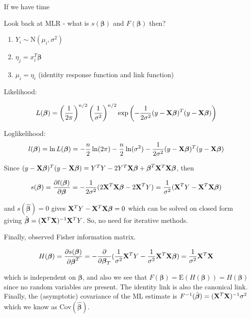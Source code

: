 \documentclass[
  ignorenonframetext,
]{beamer}
\begin{document}
\begin{frame}
If we have time
\end{frame}

\begin{frame}
\begin{block}{Look back at MLR - what is \(s(\boldsymbol{\beta})\) and
\(F(\boldsymbol{\beta})\) then?}
\protect\hypertarget{look-back-at-mlr---what-is-sboldsymbolbeta-and-fboldsymbolbeta-then}{}
\begin{enumerate}
\item
  \(Y_i \sim \text{N}(\mu_i, \sigma^2)\)
\item
  \(\eta_j = x_i^T\boldsymbol{\beta}\)
\item
  \(\mu_i = \eta_i\) (identity response function and link function)
\end{enumerate}

Likelihood:

\[L(\boldsymbol{\beta}) = \left(\frac{1}{2\pi}\right)^{n/2}\left(\frac{1}{\sigma^2}\right)^{n/2} \exp\left(-\frac{1}{2\sigma^2}(y-{\bf X}\boldsymbol{\beta})^T(y-{\bf X}\boldsymbol{\beta})\right)\]

Loglikelihood:
\[l(\boldsymbol{\beta}) = \ln L(\boldsymbol{\beta}) = -\frac{n}{2} \ln (2\pi) - \frac{n}{2} \ln (\sigma^2) - \frac{1}{2\sigma^2}(y-{\bf X}\boldsymbol{\beta})^T(y-{\bf X}\boldsymbol{\beta})\]
\end{block}
\end{frame}

\begin{frame}
Since
\((y-{\bf X}\boldsymbol{\beta})^T(y-{\bf X}\boldsymbol{\beta}) = Y^TY - 2Y^T{\bf X}\boldsymbol{\beta} + \boldsymbol{\beta}^T{\bf X}^T{\bf X}\boldsymbol{\beta}\),
then

\[s(\boldsymbol{\beta}) = \frac{\partial l(\boldsymbol{\beta})}{\partial \boldsymbol{\beta}} = -\frac{1}{2\sigma^2}(2{\bf X}^T{\bf X}\boldsymbol{\beta}-2{\bf X}^TY) = \frac{1}{\sigma^2}({\bf X}^TY - {\bf X}^T{\bf X}\boldsymbol{\beta})\]

and \(s(\hat{\boldsymbol{\beta}}) = 0\) gives
\({\bf X}^TY - {\bf X}^T{\bf X}\boldsymbol{\beta} = 0\) which can be
solved on closed form giving
\(\hat{\boldsymbol{\beta}} = ({\bf X}^T{\bf X})^{-1}{\bf X}^TY\). So, no
need for iterative methods.
\end{frame}

\begin{frame}
Finally, observed Fisher information matrix.

\[H(\boldsymbol{\beta}) = \frac{\partial s(\boldsymbol{\beta})}{\partial \boldsymbol{\beta}^T} = -\frac{\partial}{\partial \boldsymbol{\beta}_T}(\frac{1}{\sigma^2}{\bf X}^TY - \frac{1}{\sigma^2}{\bf X}^T{\bf X}\boldsymbol{\beta}) = \frac{1}{\sigma^2}{\bf X}^T{\bf X}\]

which is independent on \(\boldsymbol{\beta}\), and also we see that
\(F(\boldsymbol{\beta})=\text{E}(H(\boldsymbol{\beta}))=H(\boldsymbol{\beta})\)
since no random variables are present. The identity link is also the
canonical link. Finally, the (asymptotic) covariance of the ML estimate
is \(F^{-1}(\hat{\boldsymbol{\beta}})=({\bf X}^T{\bf X})^{-1}\sigma^2\)
which we know as \(\text{Cov}(\hat{\boldsymbol{\beta}})\).
\end{frame}
\end{document}
